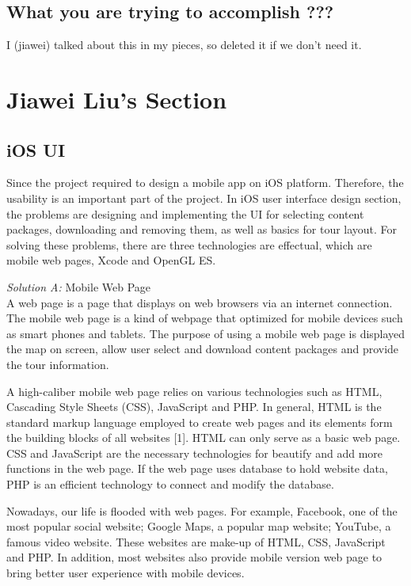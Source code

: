 \documentclass[letterpaper, 10pt,titlepage]{article}
\begin{document}
                                       
\subsection{What you are trying to accomplish ???}
I (jiawei) talked about this in my pieces, so deleted it if we don't need it.


\vspace{0.3cm}




\section{Jiawei Liu's Section}

\subsection{iOS UI}
Since the project required to design a mobile app on iOS platform. Therefore, the usability is an important part of the project. In iOS user interface design section, the problems are designing and implementing the UI for selecting content packages, downloading and removing them, as well as basics for tour layout. For solving these problems, there are three technologies are effectual, which are mobile web pages, Xcode and OpenGL ES.


\textit{Solution A:} Mobile Web Page\\
A web page is a page that displays on web browsers via an internet connection. The mobile web page is a kind of webpage that optimized for mobile devices such as smart phones and tablets. The purpose of using a mobile web page is displayed the map on screen, allow user select and download content packages and provide the tour information.


A high-caliber mobile web page relies on various technologies such as HTML, Cascading Style Sheets (CSS), JavaScript and PHP. In general, HTML is the standard markup language employed to create web pages and its elements form the building blocks of all websites [1]. HTML can only serve as a basic web page. CSS and JavaScript are the necessary technologies for beautify and add more functions in the web page. If the web page uses database to hold website data, PHP is an efficient technology to connect and modify the database. 


Nowadays, our life is flooded with web pages. For example, Facebook, one of the most popular social website; Google Maps, a popular map website; YouTube, a famous video website. These websites are make-up of HTML, CSS, JavaScript and PHP. In addition, most websites also provide mobile version web page to bring better user experience with mobile devices. 
\end{document}
